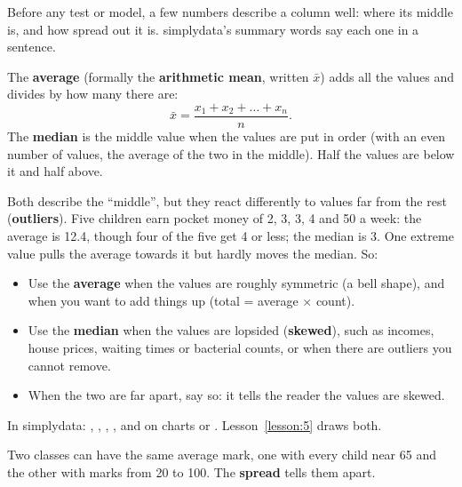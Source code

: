 

Before any test or model, a few numbers describe a column well: where its middle is, and how
spread out it is. simplydata's summary words say each one in a sentence.


The \textbf{average} (formally the \textbf{arithmetic mean}, written $\bar{x}$) adds all the values
and divides by how many there are:
\[
  \bar{x} = \frac{x_1 + x_2 + \dots + x_n}{n}.
\]
The \textbf{median} is the middle value when the values are put in order (with an even number of
values, the average of the two in the middle). Half the values are below it and half above.

Both describe the ``middle'', but they react differently to values far from the rest
(\textbf{outliers}). Five children earn pocket money of 2, 3, 3, 4 and 50 a week: the average is
12.4, though four of the five get 4 or less; the median is 3. One extreme value pulls the average
towards it but hardly moves the median. So:

\begin{itemize}
  \item Use the \textbf{average} when the values are roughly symmetric (a bell shape), and when you
    want to add things up (total = average $\times$ count).
  \item Use the \textbf{median} when the values are lopsided (\textbf{skewed}), such as incomes,
    house prices, waiting times or bacterial counts, or when there are outliers you cannot
    remove.
  \item When the two are far apart, say so: it tells the reader the values are skewed.
\end{itemize}

In simplydata: , ,
, , and on charts  or
. Lesson~\ref{lesson:5} draws both.


Two classes can have the same average mark, one with every child near 65 and the other with
marks from 20 to 100. The \textbf{spread} tells them apart.

